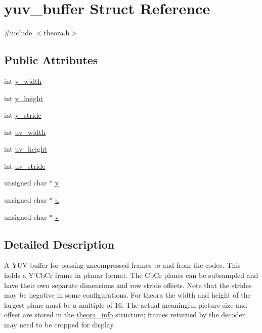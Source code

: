 \hypertarget{structyuv__buffer}{\section{yuv\+\_\+buffer Struct Reference}
\label{structyuv__buffer}
}


{\ttfamily \#include $<$theora.\+h$>$}

\subsection*{Public Attributes}
\begin{DoxyCompactItemize}
\item 
int \hyperlink{structyuv__buffer_aaa6c06c071da933231647238418d5fc0}{y\+\_\+width}
\item 
int \hyperlink{structyuv__buffer_a5a8b60e012247e2caffcbbaca99414e0}{y\+\_\+height}
\item 
int \hyperlink{structyuv__buffer_a9cdf61834c11b2351640a4a243ad0549}{y\+\_\+stride}
\item 
int \hyperlink{structyuv__buffer_a8c59a57c35af0be519ee47f15e49fe2b}{uv\+\_\+width}
\item 
int \hyperlink{structyuv__buffer_a640f1a0b456d3807f9f0538b22f10097}{uv\+\_\+height}
\item 
int \hyperlink{structyuv__buffer_ab265cc24ffb5650bf52daf223b0debb9}{uv\+\_\+stride}
\item 
unsigned char $\ast$ \hyperlink{structyuv__buffer_a725727c70eeced6b8c90866973399ac1}{y}
\item 
unsigned char $\ast$ \hyperlink{structyuv__buffer_a8b1857afe3ffac28f259499a57a559e1}{u}
\item 
unsigned char $\ast$ \hyperlink{structyuv__buffer_aa429491dd112adb0254672c59ef55075}{v}
\end{DoxyCompactItemize}


\subsection{Detailed Description}
A Y\+U\+V buffer for passing uncompressed frames to and from the codec. This holds a Y'Cb\+Cr frame in planar format. The Cb\+Cr planes can be subsampled and have their own separate dimensions and row stride offsets. Note that the strides may be negative in some configurations. For theora the width and height of the largest plane must be a multiple of 16. The actual meaningful picture size and offset are stored in the \hyperlink{structtheora__info}{theora\+\_\+info} structure; frames returned by the decoder may need to be cropped for display.

